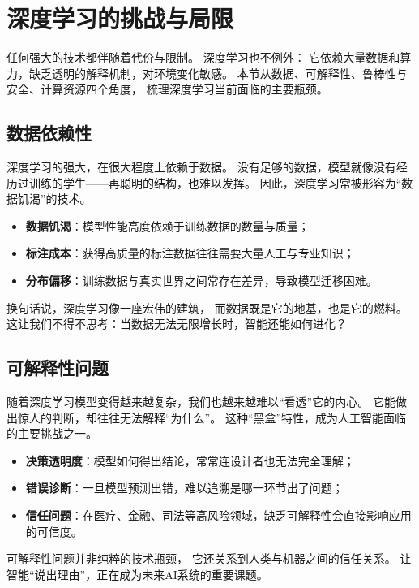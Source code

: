 \section{深度学习的挑战与局限}

任何强大的技术都伴随着代价与限制。  
深度学习也不例外：  
它依赖大量数据和算力，缺乏透明的解释机制，对环境变化敏感。  
本节从数据、可解释性、鲁棒性与安全、计算资源四个角度，  
梳理深度学习当前面临的主要瓶颈。

\subsection{数据依赖性}

深度学习的强大，在很大程度上依赖于数据。  
没有足够的数据，模型就像没有经历过训练的学生——再聪明的结构，也难以发挥。  
因此，深度学习常被形容为“数据饥渴”的技术。

\begin{itemize}
\item \textbf{数据饥渴}：模型性能高度依赖于训练数据的数量与质量；
\item \textbf{标注成本}：获得高质量的标注数据往往需要大量人工与专业知识；
\item \textbf{分布偏移}：训练数据与真实世界之间常存在差异，导致模型迁移困难。
\end{itemize}

换句话说，深度学习像一座宏伟的建筑，  
而数据既是它的地基，也是它的燃料。  
这让我们不得不思考：当数据无法无限增长时，智能还能如何进化？

\subsection{可解释性问题}

随着深度学习模型变得越来越复杂，我们也越来越难以“看透”它的内心。  
它能做出惊人的判断，却往往无法解释“为什么”。  
这种“黑盒”特性，成为人工智能面临的主要挑战之一。

\begin{itemize}
\item \textbf{决策透明度}：模型如何得出结论，常常连设计者也无法完全理解；
\item \textbf{错误诊断}：一旦模型预测出错，难以追溯是哪一环节出了问题；
\item \textbf{信任问题}：在医疗、金融、司法等高风险领域，缺乏可解释性会直接影响应用的可信度。
\end{itemize}

可解释性问题并非纯粹的技术瓶颈，  
它还关系到人类与机器之间的信任关系。  
让智能“说出理由”，正在成为未来AI系统的重要课题。

